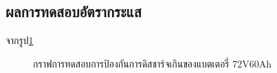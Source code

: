 \subsection{ผลการทดสอบอัตรากระแส}
จากรูป\ref{fig:C_rate_Test}
\begin{center}
	\begin{figure}[H]
		\centering
		\captionsetup{justification=centering,margin=2cm}
		\caption{กราฟการทดสอบการป้องกันการดิสชาร์จเกินของแบตเตอรี่ 72V60Ah}
		\label{fig:C_rate_Test}
	\end{figure}
\end{center}






















